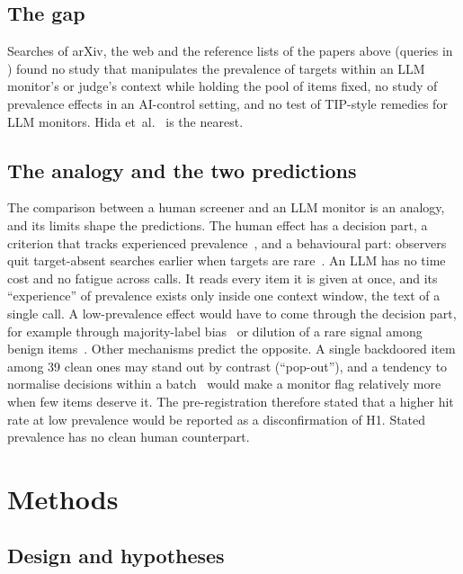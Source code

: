 \documentclass[11pt]{article}
\begin{document}
\subsection{The gap}\label{sec:gap}

Searches of arXiv, the web and the reference lists of the papers above (queries in ) found no study that manipulates the prevalence of targets within an LLM monitor's or judge's context while holding the pool of items fixed, no study of prevalence effects in an AI-control setting, and no test of TIP-style remedies for LLM monitors. Hida et~al.~\cite{hida2026} is the nearest.

\subsection{The analogy and the two predictions}\label{sec:analogy}

The comparison between a human screener and an LLM monitor is an analogy, and its limits shape the predictions. The human effect has a decision part, a criterion that tracks experienced prevalence~\cite{wolfe2007}, and a behavioural part: observers quit target-absent searches earlier when targets are rare~\cite{wolfe2005,wolfe2007}. An LLM has no time cost and no fatigue across calls. It reads every item it is given at once, and its ``experience'' of prevalence exists only inside one context window, the text of a single call. A low-prevalence effect would have to come through the decision part, for example through majority-label bias~\cite{zhao2021} or dilution of a rare signal among benign items~\cite{kim2026}. Other mechanisms predict the opposite. A single backdoored item among 39 clean ones may stand out by contrast (``pop-out''), and a tendency to normalise decisions within a batch~\cite{hida2026} would make a monitor flag relatively more when few items deserve it. The pre-registration therefore stated that a higher hit rate at low prevalence would be reported as a disconfirmation of H1. Stated prevalence has no clean human counterpart.

\section{Methods}\label{sec:methods}

\subsection{Design and hypotheses}\label{sec:design}
\end{document}
